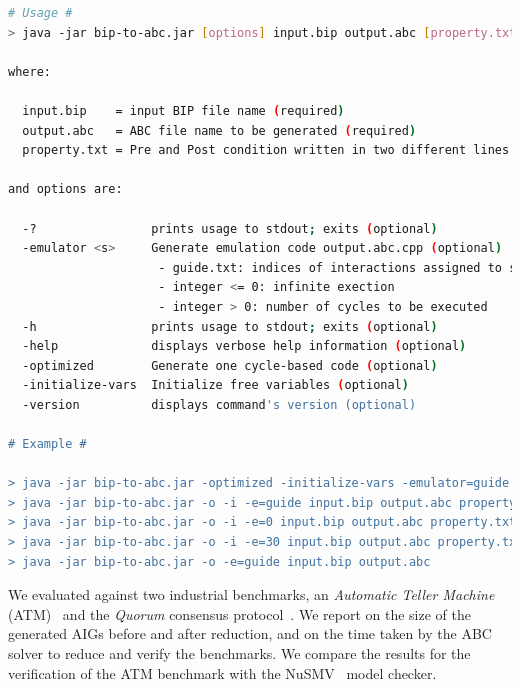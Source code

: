 \begin{lstlisting}[language=Bash]
# Usage #
> java -jar bip-to-abc.jar [options] input.bip output.abc [property.txt]

where:

  input.bip    = input BIP file name (required)
  output.abc   = ABC file name to be generated (required)
  property.txt = Pre and Post condition written in two different lines (optional)

and options are:

  -?                prints usage to stdout; exits (optional)  
  -emulator <s>     Generate emulation code output.abc.cpp (optional)  
                     - guide.txt: indices of interactions assigned to selector 
                     - integer <= 0: infinite exection 
                     - integer > 0: number of cycles to be executed 
  -h                prints usage to stdout; exits (optional) 
  -help             displays verbose help information (optional)
  -optimized        Generate one cycle-based code (optional)
  -initialize-vars  Initialize free variables (optional)
  -version          displays command's version (optional)
  
# Example #

> java -jar bip-to-abc.jar -optimized -initialize-vars -emulator=guide input.bip output.abc property.txt
> java -jar bip-to-abc.jar -o -i -e=guide input.bip output.abc property.txt
> java -jar bip-to-abc.jar -o -i -e=0 input.bip output.abc property.txt
> java -jar bip-to-abc.jar -o -i -e=30 input.bip output.abc property.txt  
> java -jar bip-to-abc.jar -o -e=guide input.bip output.abc
\end{lstlisting}



We evaluated \biptool{} against two industrial benchmarks, 
an {\em Automatic Teller Machine} (ATM)~\cite{atm} and the {\em Quorum} consensus
protocol~\cite{guerraoui2012speculative}. We report on the size of the generated
AIGs before and after reduction, and on the time taken by the ABC solver to 
reduce and verify the benchmarks. We compare the results for the 
verification of the ATM benchmark
with the NuSMV~\cite{nusmv} model checker.



